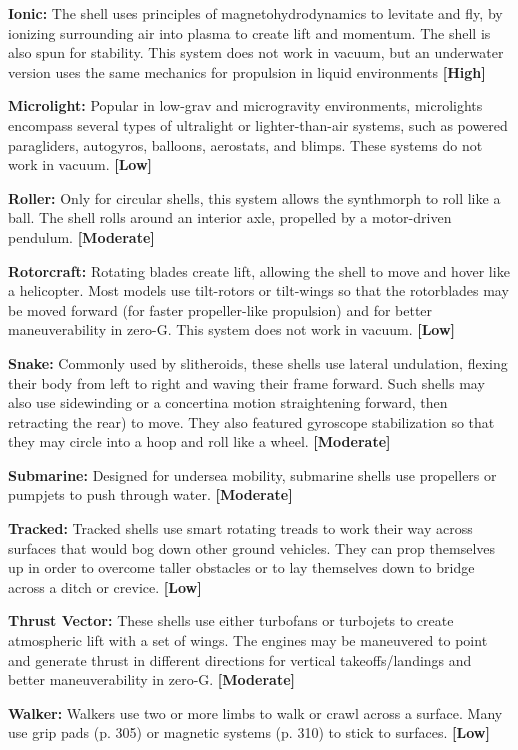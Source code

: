 \textbf{Ionic:} The shell uses principles of magnetohydrodynamics
to levitate and fly, by ionizing surrounding
air into plasma to create lift and momentum. The 
shell is also spun for stability. This system does not 
work in vacuum, but an underwater version uses the 
same mechanics for propulsion in liquid environments
\textbf{[High]}

\textbf{Microlight:} Popular in low-grav and microgravity 
environments, microlights encompass several types 
of ultralight or lighter-than-air systems, such as powered
paragliders, autogyros, balloons, aerostats, and
blimps. These systems do not work in vacuum. \textbf{[Low]}

\textbf{Roller:} Only for circular shells, this system allows 
the synthmorph to roll like a ball. The shell rolls 
around an interior axle, propelled by a motor-driven 
pendulum. \textbf{[Moderate]}

\textbf{Rotorcraft:} Rotating blades create lift, allowing 
the shell to move and hover like a helicopter. Most 
models use tilt-rotors or tilt-wings so that the rotorblades
may be moved forward (for faster propeller-like
propulsion) and for better maneuverability in
zero-G. This system does not work in vacuum. \textbf{[Low]}

\textbf{Snake:} Commonly used by slitheroids, these shells 
use lateral undulation, flexing their body from left to 
right and waving their frame forward. Such shells may 
also use sidewinding or a concertina motion straightening
forward, then retracting the rear) to move. They
also featured gyroscope stabilization so that they may 
circle into a hoop and roll like a wheel. \textbf{[Moderate]}

\textbf{Submarine:} Designed for undersea mobility, submarine
shells use propellers or pumpjets to push through
water. \textbf{[Moderate]}

\textbf{Tracked:} Tracked shells use smart rotating treads to 
work their way across surfaces that would bog down 
other ground vehicles. They can prop themselves up 
in order to overcome taller obstacles or to lay themselves
down to bridge across a ditch or crevice. \textbf{[Low]}

\textbf{Thrust Vector:} These shells use either turbofans or 
turbojets to create atmospheric lift with a set of wings. 
The engines may be maneuvered to point and generate 
thrust in different directions for vertical takeoffs/landings
and better maneuverability in zero-G. \textbf{[Moderate]}

\textbf{Walker:} Walkers use two or more limbs to walk or 
crawl across a surface. Many use grip pads (p. 305) or 
magnetic systems (p. 310) to stick to surfaces. \textbf{[Low]}

